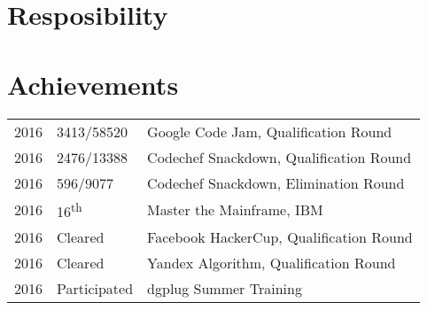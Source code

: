 \documentclass[]{deedy-resume-openfont}
\begin{document}
\begin{minipage}[t]{0.66\textwidth}

\section{Resposibility}
\sectionsep

\sectionsep


\section{Achievements}
\begin{tabular}{rll}
2016     & 3413/58520 & Google Code Jam, Qualification Round\\
2016     & 2476/13388 & Codechef Snackdown, Qualification Round\\
2016     & 596/9077   & Codechef Snackdown, Elimination Round\\
2016     & 16\textsuperscript{th}  & Master the Mainframe, IBM\\
2016     & Cleared & Facebook HackerCup, Qualification Round\\
2016     & Cleared & Yandex Algorithm, Qualification Round\\
2016     & Participated & dgplug Summer Training\\
\end{tabular}
\sectionsep

\end{minipage}
\end{document}
